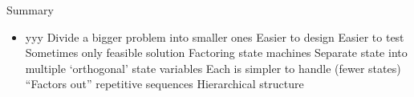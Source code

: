 \begin{frame}[fragile]{Summary}
\begin{itemize}
\item yyy
Divide a bigger problem into smaller ones
Easier to design
Easier to test
Sometimes only feasible solution
Factoring state machines
Separate state into multiple `orthogonal' state variables
Each is simpler to handle (fewer states)
``Factors out'' repetitive sequences
Hierarchical structure
\end{itemize}
\end{frame}





